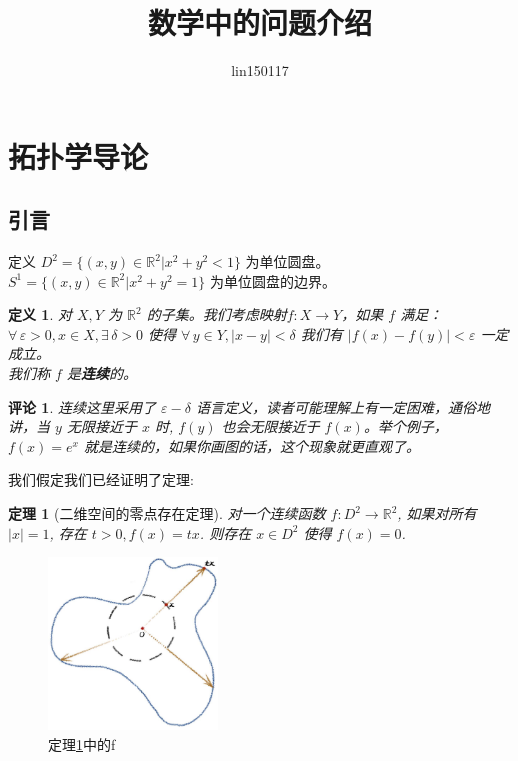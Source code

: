 \documentclass[a4paper,10pt]{article}
\title{数学中的问题介绍}
\author{lin150117}
\date{}
\newtheorem{definition}{定义}[section]
\newtheorem{theorem}{定理}[section]
\newtheorem{remark}{评论}
\begin{document}
\setlength{\parindent}{0pt}
\maketitle
\tableofcontents
\newpage
\section{拓扑学导论}
\subsection{引言}
定义 $ D^2=\{(x,y)\in\mathbb{R}^2|x^2+y^2<1\} $ 为单位圆盘。 $ S^1=\{(x,y)\in\mathbb{R}^2|x^2+y^2=1\} $ 为单位圆盘的边界。 
\begin{definition}
    对 $ X,Y  $ 为 $ \mathbb{R}^2 $ 的子集。我们考虑映射$ f:X\rightarrow Y $，如果 $ f  $ 满足：\\ $ \forall \,\varepsilon>0,x\in 
    X,\exists\, \delta>0  $ 使得  $ \forall \,y\in Y,|x-y|<\delta  $ 我们有 $  |f(x)-f(y)|<\varepsilon $ 一定成立。\\我们称 $ f  $ 是\textbf{连续}的。
\end{definition}
\begin{remark}
    连续这里采用了 $ \varepsilon-\delta  $ 语言定义，读者可能理解上有一定困难，通俗地讲，当 $ y $ 无限接近于 $ x $ 时, $ f(y) $ 也会无限接近于 $ f(x) $。举个例子， $ f(x)=e^x  $ 就是连续的，如果你画图的话，这个现象就更直观了。 
\end{remark}
我们假定我们已经证明了定理:
\begin{theorem}[二维空间的零点存在定理]\label{定理1}
    对一个连续函数 $ f:D^2\rightarrow \mathbb{R}^2  $, 如果对所有 $ |x|=1 $, 存在 $ t>0,f(x)=tx $. 则存在 $ x\in D^2 $ 使得 $ f(x)=0 $. 
\end{theorem}


\begin{figure}[htb]
    \centering
    \includegraphics[width=0.4\textwidth]{拓扑学-课本.jpg}
    \caption{定理\ref{定理1}中的f}
    \label{定理中的f}
\end{figure}
\end{document}
